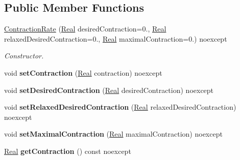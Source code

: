 \subsection*{Public Member Functions}
\begin{DoxyCompactItemize}
\item 
\hyperlink{classSpacy_1_1Mixin_1_1ContractionRate_a3d6b03823ce3951bafd51ceaac732bf7}{Contraction\-Rate} (\hyperlink{classSpacy_1_1Real}{Real} desired\-Contraction=0., \hyperlink{classSpacy_1_1Real}{Real} relaxed\-Desired\-Contraction=0., \hyperlink{classSpacy_1_1Real}{Real} maximal\-Contraction=0.) noexcept
\begin{DoxyCompactList}\small\item\em Constructor. \end{DoxyCompactList}\item 
\hypertarget{classSpacy_1_1Mixin_1_1ContractionRate_ab9215981f0454bd5d641abad582e64e5}{void {\bfseries set\-Contraction} (\hyperlink{classSpacy_1_1Real}{Real} contraction) noexcept}\label{classSpacy_1_1Mixin_1_1ContractionRate_ab9215981f0454bd5d641abad582e64e5}

\item 
\hypertarget{classSpacy_1_1Mixin_1_1ContractionRate_a26eaa6344b5b2191931a9fd87ed96f39}{void {\bfseries set\-Desired\-Contraction} (\hyperlink{classSpacy_1_1Real}{Real} desired\-Contraction) noexcept}\label{classSpacy_1_1Mixin_1_1ContractionRate_a26eaa6344b5b2191931a9fd87ed96f39}

\item 
\hypertarget{classSpacy_1_1Mixin_1_1ContractionRate_ac6e47c0ab683643fea7490703f02632d}{void {\bfseries set\-Relaxed\-Desired\-Contraction} (\hyperlink{classSpacy_1_1Real}{Real} relaxed\-Desired\-Contraction) noexcept}\label{classSpacy_1_1Mixin_1_1ContractionRate_ac6e47c0ab683643fea7490703f02632d}

\item 
\hypertarget{classSpacy_1_1Mixin_1_1ContractionRate_acc99ba536cd9a027baa50a1412d9d216}{void {\bfseries set\-Maximal\-Contraction} (\hyperlink{classSpacy_1_1Real}{Real} maximal\-Contraction) noexcept}\label{classSpacy_1_1Mixin_1_1ContractionRate_acc99ba536cd9a027baa50a1412d9d216}

\item 
\hypertarget{classSpacy_1_1Mixin_1_1ContractionRate_a49a83927f070d2dd600966f491f1f304}{\hyperlink{classSpacy_1_1Real}{Real} {\bfseries get\-Contraction} () const noexcept}\label{classSpacy_1_1Mixin_1_1ContractionRate_a49a83927f070d2dd600966f491f1f304}


\end{DoxyCompactItemize}
